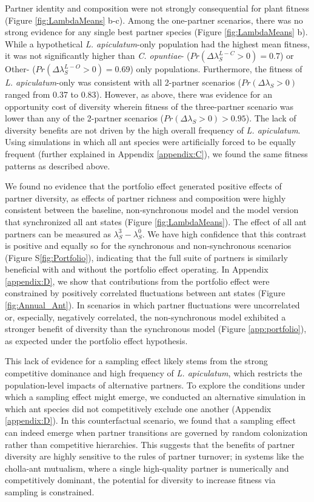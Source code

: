 \documentclass[11pt]{article}
\begin{document}
Partner identity and composition were not strongly consequential for plant fitness (Figure \ref{fig:LambdaMeans} b-c). 
Among the one-partner scenarios, there was no strong evidence for any single best partner species (Figure \ref{fig:LambdaMeans} b). 
While a hypothetical \textit{L. apiculatum}-only population had the highest mean fitness, it was not significantly higher than \textit{C. opuntiae}-  ($Pr(\Delta\lambda^{L-C}_{S}>0)=0.7$) or Other- ($Pr(\Delta\lambda^{L-O}_{S}>0)=0.69$) only populations. 
Furthermore, the fitness of \textit{L. apiculatum}-only was consistent with all 2-partner scenarios ($Pr(\Delta\lambda_{S}>0)$ ranged from 0.37 to 0.83).
However, as above, there was evidence for an opportunity cost of diversity wherein fitness of the three-partner scenario was lower than any of the 2-partner scenarios ($Pr(\Delta\lambda_{S}>0)>0.95$). 
The lack of diversity benefits are not driven by the high overall frequency of \textit{L. apiculatum}. 
Using simulations in which all ant species were artificially forced to be equally frequent (further explained in Appendix \ref{appendix:C}), we found the same fitness patterns as described above. 

We found no evidence that the portfolio effect generated positive effects of partner diversity, as effects of partner richness and composition were highly consistent between the baseline, non-synchronous model and the model version that synchronized all ant states (Figure \ref{fig:LambdaMeans}).
The effect of all ant partners can be measured as $\lambda^{3}_{S} - \lambda^{0}_{S}$.
We have high confidence that this contrast is positive and equally so for the synchronous and non-synchronous scenarios (Figure S\ref{fig:Portfolio}), indicating that the full suite of partners is similarly beneficial with and without the portfolio effect operating. 
In Appendix \ref{appendix:D}, we show that contributions from the portfolio effect were constrained by positively correlated fluctuations between ant states (Figure \ref{fig:Annual_Ant}). 
In scenarios in which partner fluctuations were uncorrelated or, especially, negatively correlated, the non-synchronous model exhibited a stronger benefit of diversity than the synchronous model (Figure \ref{app:portfolio}), as expected under the portfolio effect hypothesis.

This lack of evidence for a sampling effect likely stems from the strong competitive dominance and high frequency of \textit{L. apiculatum}, which restricts the population-level impacts of alternative partners. 
To explore the conditions under which a sampling effect might emerge, we conducted an alternative simulation in which ant species did not competitively exclude one another (Appendix \ref{appendix:D}).
In this counterfactual scenario, we found that a sampling effect can indeed emerge when partner transitions are governed by random colonization rather than competitive hierarchies. 
This suggests that the benefits of partner diversity are highly sensitive to the rules of partner turnover; in systems like the cholla-ant mutualism, where a single high-quality partner is numerically and competitively dominant, the potential for diversity to increase fitness via sampling is constrained.
\end{document}
